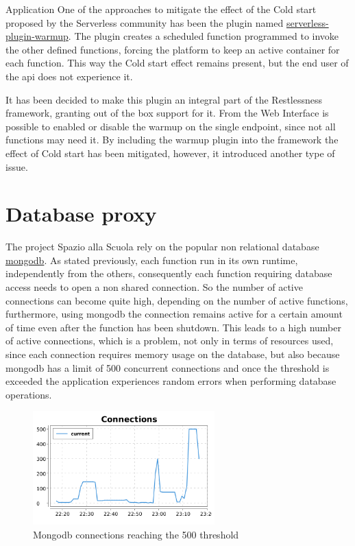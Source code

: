 \begin{chapter}{Application}
    One of the approaches to mitigate the effect of the Cold start proposed by the
    Serverless community has been the plugin named
    \href{https://www.npmjs.com/package/serverless-plugin-warmup}{serverless-plugin-warmup}.
    The plugin creates a scheduled function programmed to invoke the other defined functions,
    forcing the platform to keep an active container for each function.
    This way the Cold start effect remains present, but the end user of the api does
    not experience it.

    It has been decided to make this plugin an integral part of the Restlessness framework,
    granting out of the box support for it. From the Web Interface is possible to
    enabled or disable the warmup on the single endpoint, since not all functions may
    need it.
    By including the warmup plugin into the framework the effect of Cold start has
    been mitigated, however, it introduced another type of issue.

    \section{Database proxy}
    The project Spazio alla Scuola rely on the popular non relational database
    \href{https://www.mongodb.com}{mongodb}. As stated previously, each function
    run in its own runtime, independently from the others, consequently each function
    requiring database access needs to open a non shared connection.
    So the number of active connections can become quite high, depending on the number
    of active functions, furthermore, using mongodb the connection remains active for
    a certain amount of time even after the function has been shutdown.
    This leads to a high number of active connections, which is a problem, not only
    in terms of resources used, since each connection requires memory usage on the
    database, but also because mongodb has a limit of 500 concurrent connections
    and once the threshold is exceeded the application experiences random errors when
    performing database operations.
    \begin{figure}
        \centering
        \includegraphics[width=7cm]{source/images/mongo-connections.png}
        \caption{Mongodb connections reaching the 500 threshold}
    \end{figure}


\end{chapter}
